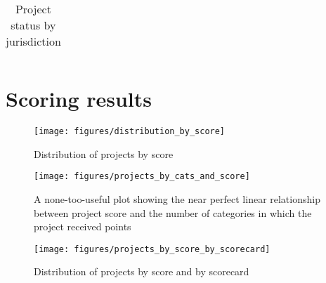 \documentclass[10pt, letterpaper, final, twoside, onecolumn]{memoir}%
\begin{document}
\begin{table}[htdp]
\scriptsize %
\caption{Project status by jurisdiction}
\begin{center}
\begin{tabularx}{0.5\textwidth}{>{\raggedright\arraybackslash}p{8pc}>{\raggedright\arraybackslash}X>{\raggedright\arraybackslash}X>{\raggedright\arraybackslash}X}
\toprule



\end{tabularx}
\end{center}
\label{tb:projects_by_jurisdiction}
\end{table}%


 
\chapter{Scoring results}
\lipsum[1-2]

\begin{figure}[htbp]
\begin{center}
\texttt{[image: figures/distribution\_by\_score]}

\caption{Distribution of projects by score}
\label{fig:distribution_by_score}
\end{center}
\end{figure}



\begin{figure}[htbp]
\begin{center}
\texttt{[image: figures/projects\_by\_cats\_and\_score]}

\caption{A none-too-useful plot showing the near perfect linear relationship between project score and the number of categories in which the project received points}
\label{fig:projects_by_cats_and_score}
\end{center}
\end{figure}



 
\begin{figure}[htbp]
\begin{center}
\texttt{[image: figures/projects\_by\_score\_by\_scorecard]}

\caption{Distribution of projects by score and by scorecard}
\label{fig:projects_by_score_by_scorecard}
\end{center}
\end{figure}
\end{document}

